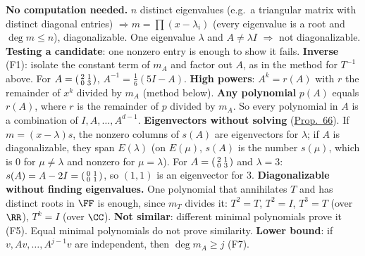 \documentclass[10pt]{scrartcl}
\begin{document}
\begin{shortcuts}
  \ii \textbf{No computation needed.} $n$ distinct eigenvalues (e.g.\ a triangular matrix with distinct diagonal entries) $\Rightarrow m=\prod(x-\lambda_i)$ (every eigenvalue is a root and $\deg m\le n$), diagonalizable. One eigenvalue $\lambda$ and $A\ne\lambda I$ $\Rightarrow$ not diagonalizable.
  \ii \textbf{Testing a candidate}: one nonzero entry is enough to show it fails.
  \ii \textbf{Inverse} (F1): isolate the constant term of $m_A$ and factor out $A$, as in the method for $T^{-1}$ above. For $A=\begin{psmallmatrix}2&1\\0&3\end{psmallmatrix}$, $A^{-1}=\frac16(5I-A)$.
  \ii \textbf{High powers}: $A^k=r(A)$ with $r$ the remainder of $x^k$ divided by $m_A$ (method below).
  \ii \textbf{Any polynomial} $p(A)$ equals $r(A)$, where $r$ is the remainder of $p$ divided by $m_A$. So every polynomial in $A$ is a combination of $I,A,\dots,A^{d-1}$.
  \ii \textbf{Eigenvectors without solving} (\hyperref[prop-66]{Prop.~66}). If $m=(x-\lambda)s$, the nonzero columns of $s(A)$ are eigenvectors for $\lambda$; if $A$ is diagonalizable, they span $E(\lambda)$ (on $E(\mu)$, $s(A)$ is the number $s(\mu)$, which is $0$ for $\mu\ne\lambda$ and nonzero for $\mu=\lambda$). For $A=\begin{psmallmatrix}2&1\\0&3\end{psmallmatrix}$ and $\lambda=3$: $s(A)=A-2I=\begin{psmallmatrix}0&1\\0&1\end{psmallmatrix}$, so $(1,1)$ is an eigenvector for $3$.
  \ii \textbf{Diagonalizable without finding eigenvalues.} One polynomial that annihilates $T$ and has distinct roots in $\FF$ is enough, since $m_T$ divides it: $T^2=T$, $T^2=I$, $T^3=T$ (over $\RR$), $T^k=I$ (over $\CC$).
  \ii \textbf{Not similar}: different minimal polynomials prove it (F5). Equal minimal polynomials do not prove similarity.
  \ii \textbf{Lower bound}: if $v,Av,\dots,A^{j-1}v$ are independent, then $\deg m_A\ge j$ (F7).
\end{shortcuts}
\end{document}

